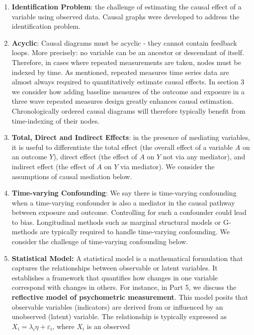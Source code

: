 \documentclass[
  singlecolumn]{report}
\begin{document}
\begin{enumerate}
\def\labelenumi{\arabic{enumi}.}
\setcounter{enumi}{9}
\item
  \textbf{Identification Problem}: the challenge of estimating the
  causal effect of a variable using observed data. Causal graphs were
  developed to address the identification problem.
\item
  \textbf{Acyclic}: Causal diagrams must be acyclic - they cannot
  contain feedback loops. More precisely: no variable can be an ancestor
  or descendant of itself. Therefore, in cases where repeated
  measurements are taken, nodes must be indexed by time. As mentioned,
  repeated measures time series data are almost always required to
  quantitatively estimate causal effects. In section 3 we consider how
  adding baseline measures of the outcome and exposure in a three wave
  repeated measures design greatly enhances causal estimation.
  Chronologically ordered causal diagrams will therefore typically
  benefit from time-indexing of their nodes.
\item
  \textbf{Total, Direct and Indirect Effects}: in the presence of
  mediating variables, it is useful to differentiate the total effect
  (the overall effect of a variable \(A\) on an outcome \(Y\)), direct
  effect (the effect of \(A\) on \(Y\) not via any mediator), and
  indirect effect (the effect of \(A\) on \(Y\) via mediator). We
  consider the assumptions of causal mediation below.
\item
  \textbf{Time-varying Confounding}: We say there is time-varying
  confounding when a time-varying confounder is also a mediator in the
  causal pathway between exposure and outcome. Controlling for such a
  confounder could lead to bias. Longitudinal methods such as marginal
  structural models or G-methods are typically required to handle
  time-varying confounding. We consider the challenge of time-varying
  confounding below.
\item
  \textbf{Statistical Model:} A statistical model is a mathematical
  formulation that captures the relationships between observable or
  latent variables. It establishes a framework that quantifies how
  changes in one variable correspond with changes in others. For
  instance, in Part 5, we discuss the \textbf{reflective model of
  psychometric measurement}. This model posits that observable variables
  (indicators) are derived from or influenced by an unobserved (latent)
  variable. The relationship is typically expressed as
  \(X_i = \lambda_i \eta + \varepsilon_i\), where \(X_i\) is an observed

\end{enumerate}
\end{document}
